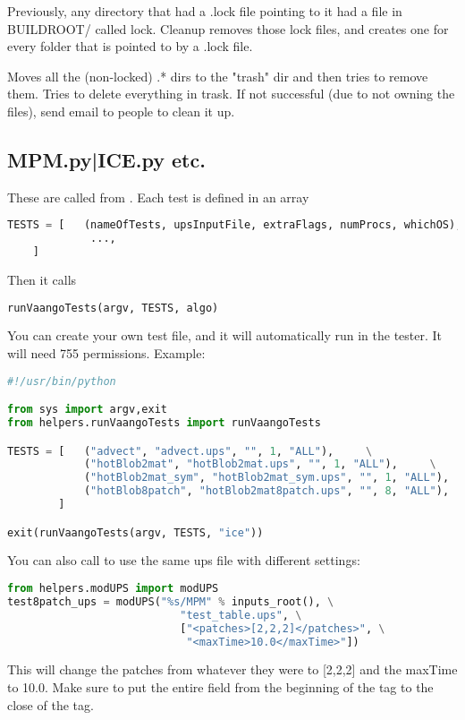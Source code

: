   Previously, any directory that had a .lock file pointing to it had a file
in BUILDROOT/ called lock.  Cleanup removes those lock files, and creates one
for every folder that is pointed to by a .lock file.

  Moves all the (non-locked) \Vaango.* dirs to the "trash" dir and then
tries to remove them.  Tries to delete everything in trask.  If not
successful (due to not owning the files), send email to people to
clean it up.

\subsection{MPM.py|ICE.py etc.}
These are called from .  Each test is defined in an array
\begin{lstlisting}[language=Python]
TESTS = [   (nameOfTests, upsInputFile, extraFlags, numProcs, whichOS),
             ...,
	]
\end{lstlisting}
Then it calls 
\begin{lstlisting}[language=Python]
runVaangoTests(argv, TESTS, algo)
\end{lstlisting}
You can create your own test file, and it will automatically run in the tester.
It will need 755 permissions.
Example:
\begin{lstlisting}[language=Python]
#!/usr/bin/python

from sys import argv,exit
from helpers.runVaangoTests import runVaangoTests

TESTS = [   ("advect", "advect.ups", "", 1, "ALL"),     \
            ("hotBlob2mat", "hotBlob2mat.ups", "", 1, "ALL"),     \
            ("hotBlob2mat_sym", "hotBlob2mat_sym.ups", "", 1, "ALL"),     \
            ("hotBlob8patch", "hotBlob2mat8patch.ups", "", 8, "ALL"),     \
        ]

exit(runVaangoTests(argv, TESTS, "ice"))
\end{lstlisting}

You can also call  to use the same ups file with different settings:
\begin{lstlisting}[language=Python]
from helpers.modUPS import modUPS
test8patch_ups = modUPS("%s/MPM" % inputs_root(), \
                           "test_table.ups", \
                           ["<patches>[2,2,2]</patches>", \
                            "<maxTime>10.0</maxTime>"])
\end{lstlisting}
This will change the  patches from whatever they 
were to [2,2,2] and the maxTime to 10.0.
Make sure to put the entire field from the beginning of the tag to the close
of the tag.

